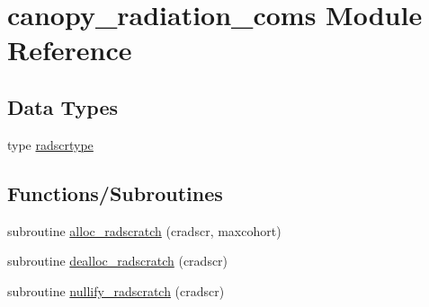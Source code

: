 \hypertarget{namespacecanopy__radiation__coms}{}\section{canopy\+\_\+radiation\+\_\+coms Module Reference}
\label{namespacecanopy__radiation__coms}
\subsection*{Data Types}
\begin{DoxyCompactItemize}
\item 
type \hyperlink{structcanopy__radiation__coms_1_1radscrtype}{radscrtype}
\end{DoxyCompactItemize}
\subsection*{Functions/\+Subroutines}
\begin{DoxyCompactItemize}
\item 
subroutine \hyperlink{namespacecanopy__radiation__coms_abf436863eec6f51fbcad29f1a0ad8833}{alloc\+\_\+radscratch} (cradscr, maxcohort)
\item 
subroutine \hyperlink{namespacecanopy__radiation__coms_abbcda361926e277937b84aa18b779d72}{dealloc\+\_\+radscratch} (cradscr)
\item 
subroutine \hyperlink{namespacecanopy__radiation__coms_a5d6cfa703bca9703874fe55efaf4f05d}{nullify\+\_\+radscratch} (cradscr)
\end{DoxyCompactItemize}
